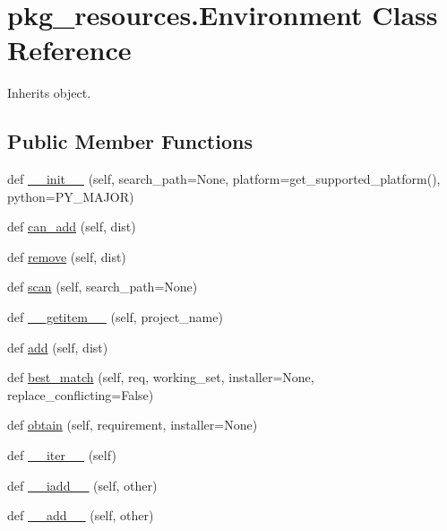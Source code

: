 \hypertarget{classpkg__resources_1_1_environment}{}\section{pkg\+\_\+resources.\+Environment Class Reference}
\label{classpkg__resources_1_1_environment}


Inherits object.

\subsection*{Public Member Functions}
\begin{DoxyCompactItemize}
\item 
def \hyperlink{classpkg__resources_1_1_environment_ac17977fcfff1f90f694316f938090eb2}{\+\_\+\+\_\+init\+\_\+\+\_\+} (self, search\+\_\+path=None, platform=get\+\_\+supported\+\_\+platform(), python=P\+Y\+\_\+\+M\+A\+J\+OR)
\item 
def \hyperlink{classpkg__resources_1_1_environment_ac68862356ee785bb410b3d2a503952f1}{can\+\_\+add} (self, dist)
\item 
def \hyperlink{classpkg__resources_1_1_environment_aa51b1c4f8c8c146f2fc83a833608a0d1}{remove} (self, dist)
\item 
def \hyperlink{classpkg__resources_1_1_environment_a2dd1caa73a329d4c50b0ab9fdec9c1d4}{scan} (self, search\+\_\+path=None)
\item 
def \hyperlink{classpkg__resources_1_1_environment_af401af1f867613b8f268ab93a1275aff}{\+\_\+\+\_\+getitem\+\_\+\+\_\+} (self, project\+\_\+name)
\item 
def \hyperlink{classpkg__resources_1_1_environment_a0ba8999abdb4cbc7a1965766560197fc}{add} (self, dist)
\item 
def \hyperlink{classpkg__resources_1_1_environment_a7738575eddd2a89e35eff52f3462f20b}{best\+\_\+match} (self, req, working\+\_\+set, installer=None, replace\+\_\+conflicting=False)
\item 
def \hyperlink{classpkg__resources_1_1_environment_af631296df13a518bb3cd97f04efa25fd}{obtain} (self, requirement, installer=None)
\item 
def \hyperlink{classpkg__resources_1_1_environment_a7f967904be209cefe39230614470ca3f}{\+\_\+\+\_\+iter\+\_\+\+\_\+} (self)
\item 
def \hyperlink{classpkg__resources_1_1_environment_ac8fc54442fe5e9c647b57320e7ccf78a}{\+\_\+\+\_\+iadd\+\_\+\+\_\+} (self, other)
\item 
def \hyperlink{classpkg__resources_1_1_environment_a8f9750420dd62e8b71b0b2f06f424c57}{\+\_\+\+\_\+add\+\_\+\+\_\+} (self, other)
\end{DoxyCompactItemize}
